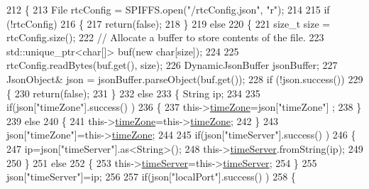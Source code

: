 \begin{DoxyCode}
212 \{
213     File rtcConfig = SPIFFS.open(\textcolor{stringliteral}{"/rtcConfig.json"}, \textcolor{stringliteral}{"r"});
214 
215     \textcolor{keywordflow}{if} (!rtcConfig) 
216     \{
217         \textcolor{keywordflow}{return}(\textcolor{keyword}{false});
218     \}
219     \textcolor{keywordflow}{else}
220     \{
221         \textcolor{keywordtype}{size\_t} size = rtcConfig.size();
222         \textcolor{comment}{// Allocate a buffer to store contents of the file.}
223         std::unique\_ptr<char[]> buf(\textcolor{keyword}{new} \textcolor{keywordtype}{char}[size]);
224 
225         rtcConfig.readBytes(buf.get(), size);
226         DynamicJsonBuffer jsonBuffer;
227         JsonObject& json = jsonBuffer.parseObject(buf.get());
228         \textcolor{keywordflow}{if} (!json.success()) 
229         \{
230               \textcolor{keywordflow}{return}(\textcolor{keyword}{false});
231         \} 
232         \textcolor{keywordflow}{else}
233         \{   String ip;
234             
235             \textcolor{keywordflow}{if}(json[\textcolor{stringliteral}{"timeZone"}].success() )
236             \{
237                 this->\hyperlink{classCoolTime_a1916d98810c2a4e9ba72867e8c1b9a99}{timeZone}=json[\textcolor{stringliteral}{"timeZone"}] ;
238             \}
239             \textcolor{keywordflow}{else}
240             \{
241                 this->\hyperlink{classCoolTime_a1916d98810c2a4e9ba72867e8c1b9a99}{timeZone}=this->\hyperlink{classCoolTime_a1916d98810c2a4e9ba72867e8c1b9a99}{timeZone};          
242             \}
243             json[\textcolor{stringliteral}{"timeZone"}]=this->\hyperlink{classCoolTime_a1916d98810c2a4e9ba72867e8c1b9a99}{timeZone};
244             
245             \textcolor{keywordflow}{if}(json[\textcolor{stringliteral}{"timeServer"}].success() )
246             \{           
247                  ip=json[\textcolor{stringliteral}{"timeServer"}].as<String>();
248                 this->\hyperlink{classCoolTime_ad2b9858f399108cb440dd1e908916f04}{timeServer}.fromString(ip);
249                 
250             \}
251             \textcolor{keywordflow}{else}
252             \{
253                 this->\hyperlink{classCoolTime_ad2b9858f399108cb440dd1e908916f04}{timeServer}=this->\hyperlink{classCoolTime_ad2b9858f399108cb440dd1e908916f04}{timeServer};
254             \}
255             json[\textcolor{stringliteral}{"timeServer"}]=ip;
256             
257             \textcolor{keywordflow}{if}(json[\textcolor{stringliteral}{"localPort"}].success() )
258             \{                       

\end{DoxyCode}
